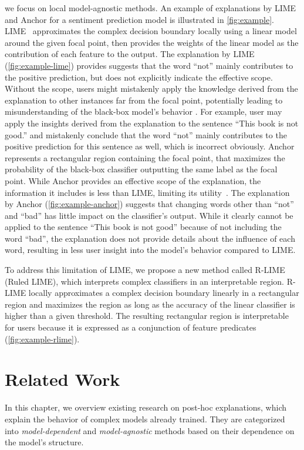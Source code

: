 \documentclass[11pt]{article}
\begin{document}
we focus on local model-agnostic methods.
An example of explanations by LIME and Anchor
for a sentiment prediction model is illustrated in \cref{fig:example}.
LIME~\cite{ribeiro2016why} approximates the complex decision boundary
locally using a linear model around the given focal point,
then provides the weights of the linear model as the contribution of each feature
to the output.
The explanation by LIME (\cref{fig:example-lime}) provides suggests that
the word ``not'' mainly contributes to the positive prediction,
but does not explicitly indicate the effective scope.
Without the scope,
users might mistakenly apply the knowledge derived from the explanation
to other instances far from the focal point,
potentially leading to misunderstanding of the black-box model's behavior
\cite{ribeiro2018anchors}.
For example,
user may apply the insights derived from the explanation
to the sentence ``This book is not good.''
and mistakenly conclude that the word ``not''
mainly contributes to the positive prediction for this sentence as well,
which is incorrect obviously.
Anchor~\cite{ribeiro2018anchors} represents a rectangular region
containing the focal point,
that maximizes the probability of the black-box classifier outputting
the same label as the focal point.
While Anchor provides an effective scope of the explanation,
the information it includes is less than LIME,
limiting its utility~\cite{ribeiro2018anchors}.
The explanation by Anchor (\cref{fig:example-anchor})
suggests that changing words other than ``not'' and ``bad''
has little impact on the classifier's output.
While it clearly cannot be applied to the sentence ``This book is not good''
because of not including the word ``bad'',
the explanation does not provide details about the influence of each word,
resulting in less user insight into the model's behavior compared to LIME.

To address this limitation of LIME,
we propose a new method called R-LIME (Ruled LIME),
which interprets complex classifiers in an interpretable region.
R-LIME locally approximates a complex decision boundary linearly
in a rectangular region and maximizes the region
as long as the accuracy of the linear classifier is
higher than a given threshold.
The resulting rectangular region is interpretable for users because it is
expressed as a conjunction of feature predicates (\cref{fig:example-rlime}).

\section{Related Work}
In this chapter,
we overview existing research on post-hoc explanations,
which explain the behavior of complex models already trained.
They are categorized
into \emph{model-dependent} and \emph{model-agnostic} methods
based on their dependence on the model's structure.
\end{document}
